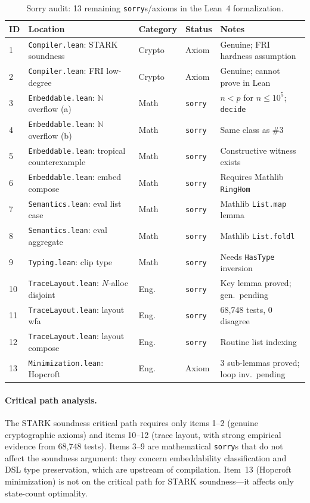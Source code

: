 \documentclass[11pt]{article}
\newcommand{\N}{\mathbb{N}}
\newcommand{\sorry}{\texttt{sorry}}
\begin{document}
\begin{table}[t]
\centering\small
\caption{Sorry audit: 13 remaining \sorry{}s/axioms in the Lean~4 formalization.}
\label{tab:sorry-audit}
\smallskip
\begin{tabular}{@{}p{0.5cm}p{3.2cm}p{1.2cm}p{1.5cm}p{3.3cm}@{}}
\toprule
\textbf{ID} & \textbf{Location} & \textbf{Category} & \textbf{Status} & \textbf{Notes} \\
\midrule
1 & \texttt{Compiler.lean}: STARK soundness & Crypto & Axiom & Genuine; FRI hardness assumption \\
2 & \texttt{Compiler.lean}: FRI low-degree & Crypto & Axiom & Genuine; cannot prove in Lean \\
3 & \texttt{Embeddable.lean}: $\N$ overflow (a) & Math & \sorry{} & $n < p$ for $n \leq 10^5$; \texttt{decide} \\
4 & \texttt{Embeddable.lean}: $\N$ overflow (b) & Math & \sorry{} & Same class as \#3 \\
5 & \texttt{Embeddable.lean}: tropical counterexample & Math & \sorry{} & Constructive witness exists \\
6 & \texttt{Embeddable.lean}: embed compose & Math & \sorry{} & Requires Mathlib \texttt{RingHom} \\
7 & \texttt{Semantics.lean}: eval list case & Math & \sorry{} & Mathlib \texttt{List.map} lemma \\
8 & \texttt{Semantics.lean}: eval aggregate & Math & \sorry{} & Mathlib \texttt{List.foldl} \\
9 & \texttt{Typing.lean}: clip type & Math & \sorry{} & Needs \texttt{HasType} inversion \\
10 & \texttt{TraceLayout.lean}: $N$-alloc disjoint & Eng. & \sorry{} & Key lemma proved; gen.\ pending \\
11 & \texttt{TraceLayout.lean}: layout wfa & Eng. & \sorry{} & 68{,}748 tests, 0 disagree \\
12 & \texttt{TraceLayout.lean}: layout compose & Eng. & \sorry{} & Routine list indexing \\
13 & \texttt{Minimization.lean}: Hopcroft & Eng. & Axiom & 3 sub-lemmas proved; loop inv.\ pending \\
\bottomrule
\end{tabular}
\end{table}

\paragraph{Critical path analysis.}
The STARK soundness critical path requires only items 1--2
(genuine cryptographic axioms) and items 10--12 (trace layout,
with strong empirical evidence from 68{,}748 tests).
Items 3--9 are mathematical \sorry{}s that do not affect the
soundness argument: they concern embeddability classification
and DSL type preservation, which are upstream of compilation.
Item~13 (Hopcroft minimization) is not on the critical path
for STARK soundness---it affects only state-count optimality.
\end{document}
